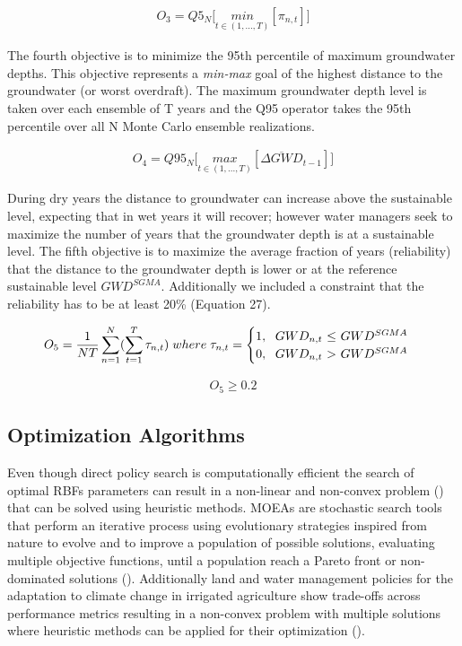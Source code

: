 \documentclass[11pt,a4paper]{article}
\begin{document}
\begin{align}
O_{3} = Q5_{N} \bigg[\underset{t\in(1,...,T)}{min}[\pi_{n,t}]\bigg]
\end{align}

The fourth objective is to minimize the 95th percentile of maximum groundwater depths. This objective represents a \textit{min-max} goal of the highest distance to the groundwater (or worst overdraft).  The maximum groundwater depth level is taken over each ensemble of T years and the Q95 operator takes the 95th percentile over all N Monte Carlo ensemble realizations. 

\begin{align}
O_{4} = Q95_{N} \bigg[\underset{t\in(1,...,T)}{max}[\overline{\Delta GWD}_{t-1}]\bigg]
\end{align}

During dry years the distance to groundwater can increase above the sustainable level, expecting that in wet years it will recover; however water managers seek to maximize the number of years that the groundwater depth is at a sustainable level. The fifth objective is to maximize the average fraction of years (reliability) that the distance to the groundwater depth is lower or at the reference sustainable level $GWD^{SGMA}$. Additionally we included a constraint  that the reliability has to be at least 20\% (Equation 27). 

\begin{align}
O_{5} = \frac{1}{NT}\sum_{n=1}^N(\sum_{t=1}^T \tau_{n,t})\; where\; \tau_{n,t} = \begin{cases}
      1, \text{\; $GWD_{n,t}$  $\leq$ $GWD^{SGMA}$}\\
      0, \text{\; $GWD_{n,t}$ $>$ $GWD^{SGMA}$}\\
\end{cases}      
\end{align}


\begin{align}
O_{5} \geq 0.2
\end{align}


\subsection{Optimization Algorithms}

Even though direct policy search is computationally efficient the search of optimal RBFs parameters can result in a non-linear and non-convex problem (\cite{giuliani_curses_2016})  that can be solved using heuristic methods. MOEAs are stochastic search tools that perform an iterative process using evolutionary strategies inspired from nature to evolve and to improve a population of possible solutions, evaluating multiple objective functions, until a population reach a Pareto front or non-dominated solutions (\cite{coello_evolutionary_2007}). Additionally land and water management policies for the adaptation to climate change in irrigated agriculture show trade-offs across performance metrics resulting in a non-convex problem with multiple solutions where heuristic methods can be applied for their optimization (\cite{maier_evolutionary_2014, memmah_metaheuristics_2015}).  
\end{document}
